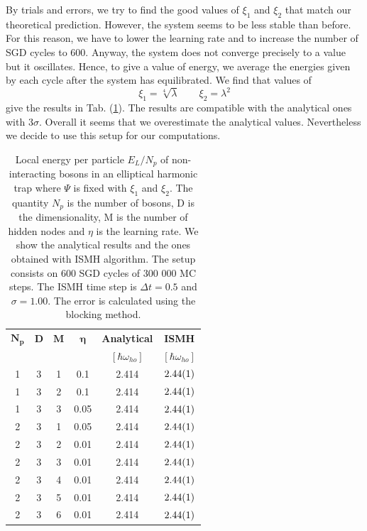 By trials and errors, we try to find the good values of $\xi_1$ and $\xi_2$ that match our theoretical prediction. However, the system seems to be less stable than before. For this reason, we have to lower the learning rate and to increase the number of SGD cycles to 600. Anyway, the system does not converge precisely to a value but it oscillates. Hence, to give a value of energy, we average the energies given by each cycle after the system has equilibrated. We find that values of 
\begin{equation*}
	\xi_1=\sqrt[4]{\lambda}\qquad \xi_2=\lambda^2
\end{equation*}
give the results in Tab. (\ref{Tab:3.3}). The results are compatible with the analytical ones with $3\sigma$. Overall it seems that we overestimate the analytical values. Nevertheless we decide to use this setup for our computations.  

\begin{table}[H]
	\centering
	\caption{Local energy per particle $E_L/N_p$ of non-interacting bosons in an elliptical harmonic trap where $\Psi$ is fixed with $\xi_1$ and $\xi_2$. The quantity $N_p$ is the number of bosons, D is the dimensionality, M is the number of hidden nodes and $\eta$ is the learning rate. We show the analytical results and the ones obtained with ISMH algorithm. The setup consists on 600 SGD cycles of 300 000 MC steps. The ISMH time step is $\Delta t = 0.5$ and $\sigma = 1.00$.  The error is calculated using the blocking method.}
	\begin{tabular}{c c c c |c  c} 
		$\boldsymbol{N_p}$ & \textbf{D}  & $\boldsymbol{M}$ & $\boldsymbol{\eta}$ & \textbf{Analytical} &\textbf{ISMH} \\
		&&&&$[\hbar\omega_{ho}]$ &$[\hbar\omega_{ho}]$\\\hline
		1 & 3 & 1 &0.1 &           2.414                &        $\SI{2.44\pm 0.01}{}$                \\
		1 & 3 & 2 &0.1 &           2.414                 &     $\SI{2.44\pm 0.01}{}$                   \\
		1 & 3 & 3 &0.05 &           2.414                 &     $\SI{2.44\pm 0.01}{}$                   \\ \hline
		2 & 3 & 1 &0.05 &           2.414                 &     $\SI{2.44\pm 0.01}{}$                   \\
		2 & 3 & 2 &0.01 &           2.414                 &     $\SI{2.44\pm 0.01}{}$                   \\
		2 & 3 & 3 &0.01 &           2.414                 &      $\SI{2.44\pm 0.01}{}$                  \\
		2 & 3 & 4 &0.01 &           2.414                 &     $\SI{2.44\pm 0.01}{}$                   \\
		2 & 3 & 5 &0.01 &            2.414                &  $\SI{2.44\pm 0.01}{}$                            \\
		2 & 3 & 6 &0.01 &           2.414                 &   $\SI{2.44\pm 0.01}{}$                           \\ 
	\end{tabular}
	\label{Tab:3.3}
\end{table} 
